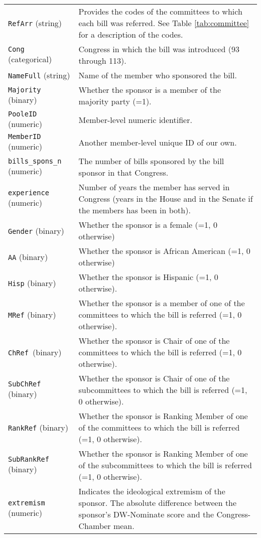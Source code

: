\documentclass[10pt,a4paper]{article}
\begin{document}
\begin{table}[!h]
\begin{tabular}{lL{12cm}}
\texttt{RefArr} (string) & Provides the codes of the committees to which each bill was referred. See Table \ref{tab:committee} for a description of the codes.\\
\texttt{Cong}	(categorical) & Congress in which the bill was introduced (93 through 113). \\
\texttt{NameFull}	(string) & Name of the member who sponsored the bill. \\
\texttt{Majority}	(binary) & Whether the sponsor is a member of the majority party (=1). \\
\texttt{PooleID} (numeric) & Member-level numeric identifier. \\
\texttt{MemberID} (numeric) & Another member-level unique ID of our own. \\
\texttt{bills\_spons\_n} (numeric) & The number of bills sponsored by the bill sponsor in that Congress. \\
\texttt{experience} (numeric) & Number of years the member has served in Congress (years in the House and in the Senate if the members has been in both).\\
\texttt{Gender} (binary) & Whether the sponsor is a female (=1, 0 otherwise) \\
\texttt{AA}  (binary) & Whether the sponsor is African American (=1, 0 otherwise) \\
\texttt{Hisp} (binary) & Whether the sponsor is Hispanic (=1, 0 otherwise).\\
\texttt{MRef}	(binary) & Whether the sponsor is a member of one of the committees to which the bill is referred (=1, 0 otherwise). \\
\texttt{ChRef	}(binary) & Whether the sponsor is Chair of one of the committees to which the bill is referred (=1, 0 otherwise). \\
\texttt{SubChRef}	(binary) &  Whether the sponsor is Chair of one of the subcommittees to which the bill is referred (=1, 0 otherwise). \\
\texttt{RankRef} (binary) & Whether the sponsor is Ranking Member of one of the committees to which the bill is referred (=1, 0 otherwise). \\
\texttt{SubRankRef}	(binary) & Whether the sponsor is Ranking Member of one of the subcommittees to which the bill is referred (=1, 0 otherwise). \\
\texttt{extremism}	(numeric) & Indicates the ideological extremism of the sponsor. The absolute difference between the sponsor's DW-Nominate score and the Congress-Chamber mean. \\

\end{tabular}
\end{table}
\end{document}
